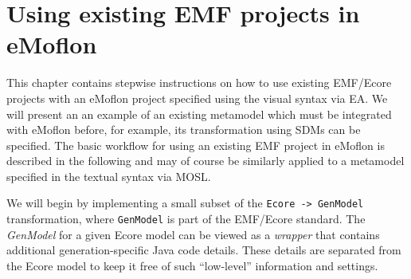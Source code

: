 \newpage

\section{Using existing EMF projects in eMoflon}
\visHeader

This chapter contains stepwise instructions on how to use existing \mbox{EMF}/Ecore projects with an eMoflon project specified using the visual syntax via EA.
We will present an an example of an existing metamodel which must be integrated with eMoflon before, for example, its transformation using SDMs can be
specified. The basic workflow for using an existing EMF project in eMoflon is described in the following and may of course be similarly applied to a metamodel
specified in the textual syntax via MOSL. 

We will begin by implementing a small subset of the \texttt{Ecore -> GenModel} transformation, where \texttt{GenModel} is part of the EMF/Ecore standard. The
\emph{GenModel} for a given Ecore model can be viewed as a \emph{wrapper} that contains additional generation-specific Java code details. These details are
separated from the Ecore model to keep it free of such ``low-level'' information and settings.





